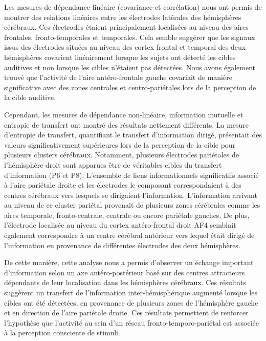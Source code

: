 Les mesures de dépendance linéaire (covariance et corrélation) nous ont permis de montrer des relations linéaires entre les électrodes latérales des hémisphères cérébraux. 
Ces électrodes étaient principalement localisées au niveau des aires frontales, fronto-temporales et temporales. 
Cela semble suggérer que les signaux issus des électrodes situées au niveau des cortex frontal et temporal des deux hémisphères covarient linéairement lorsque les sujets ont détecté les cibles auditives et non lorsque les cibles n'étaient pas détectées.
Nous avons également trouvé que l'activité de l'aire antéro-frontale gauche covariait de manière significative avec des zones centrales et centro-pariétales lors de la perception de la cible auditive. 

Cependant, les mesures de dépendance non-linéaire, information mutuelle et entropie de transfert ont montré des résultats nettement différents.
La mesure d'entropie de transfert, quantifiant le transfert d'information dirigé, présentait des valeurs significativement supérieures lors de la perception de la cible pour plusieurs clusters cérébraux. 
Notamment, plusieurs électrodes pariétales de l'hémisphère droit sont apparues être de véritables cibles du transfert d'information (P6 et P8). 
L'ensemble de liens informationnels significatifs associé à l'aire pariétale droite et les électrodes le composant correspondaient à des centres cérébraux vers lesquels se dirigaient l’information. 
L'information arrivant au niveau de ce cluster pariétal provenait de plusieurs zones cérébrales comme les aires temporale, fronto-centrale, centrale ou encore pariétale gauches. 
De plus, l'électrode localisée au niveau du cortex antéro-frontal droit AF4 semblait également correspondre à un centre cérébral antérieur vers lequel était dirigé de l'information en provenance de différentes électrodes des deux hémisphères. 

De cette manière, cette analyse nous a permis d'observer un échange important d'information selon un axe antéro-postérieur basé sur des centres attracteurs dépendants de leur localisation dans les hémisphères cérébraux. 
Ces résultats suggèrent un transfert de l'information inter-hémisphérique augmenté lorsque les cibles ont été détectées, en provenance de plusieurs zones de l'hémisphère gauche et en direction de l'aire pariétale droite. 
Ces résultats permettent de renforcer l'hypothèse que l'activité au sein d'un réseau fronto-temporo-pariétal est associée à la perception consciente de stimuli. 

